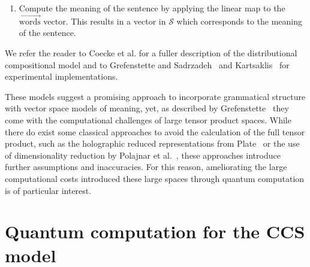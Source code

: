\begin{enumerate}
\begin{equation}
\begin{aligned}
\begin{tikzpicture}[scale=0.5, yscale=-1]
                \draw (8.center) to (6.center);
                \draw (6.center) to (7.center);
                \draw (4.center) to (5.center);
                \draw (3.center) to (5.center);
                \draw (8.center) to (7.center);
                \draw (9.center) to (14.center);
                \draw (10.center) to (15.center);
                \draw (11.center) to (16.center);
                \draw (12.center) to (17.center);
                \draw (13.center) to (18.center);
                \draw [thick, bend right=90, looseness=1.25] (24.center) to (25.center);
                \draw [thick, bend right=90, looseness=1.25] (27.center) to (28.center);
                \draw (26.center) to (29.center);
\end{tikzpicture}
\end{aligned}
\end{equation}

\item Compute the meaning of the sentence by applying the linear map to the $\overrightarrow{\mbox{words}}$ vector. This results in a vector in $\mathcal{S}$ which corresponds to the meaning of the sentence.
\end{enumerate}

\noindent We refer the reader to Coecke et al. \cite{coecke2010mathematical} for a fuller description of the distributional compositional model and to Grefenstette and Sadrzadeh~\cite{experimental-catcompdist} and Kartsaklis~\cite{kartsaklis2012unified} for experimental implementations.

These models suggest a promising approach to incorporate grammatical structure with vector space models of meaning, yet, as described by Grefenstette~\cite{GrefenstetteThesis2013} they come with the computational challenges of large tensor product spaces. While there do exist some classical approaches to avoid the calculation of the full tensor product, such as the holographic reduced representations from Plate~\cite{plate1991holographic} or the use of dimensionality reduction by Polajnar et al.~\cite{polajnar2013learning}, these approaches introduce further assumptions and inaccuracies.  For this reason, ameliorating the large computational costs introduced these large spaces through quantum computation is of particular interest.

\section{Quantum computation for the CCS model}

